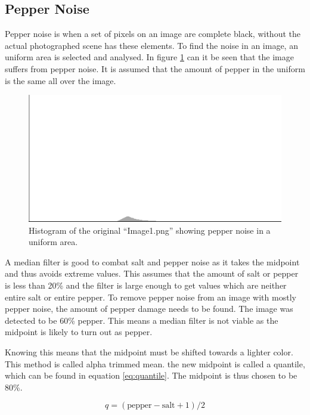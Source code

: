 \subsection{Pepper Noise}\label{image_1}
Pepper noise is when a set of pixels on an image are complete black, without the actual photographed scene has these elements.
To find the noise in an image, an uniform area is selected and analysed.
In figure \ref{fig:hist_pepper_im01} can it be seen that the image suffers from pepper noise.
It is assumed that the amount of pepper in the uniform is the same all over the image.

\begin{figure}[H]
\centering
\includegraphics[width = \histogramWidth]{graphics/hist1_uniform.png}
\caption{Histogram of the original ``Image1.png'' showing pepper noise in a uniform area.}
\label{fig:hist_pepper_im01}
\end{figure}

A median filter is good to combat salt and pepper noise as it takes the midpoint and thus avoids extreme values.
This assumes that the amount of salt or pepper is less than 20\% and the filter is large enough to get values which are neither entire salt or entire pepper.
To remove pepper noise from an image with mostly pepper noise, the amount of pepper damage needs to be found.
The image was detected to be 60\% pepper.
This means a median filter is not viable as the midpoint is likely to turn out as pepper.

Knowing this means that the midpoint must be shifted towards a lighter color.
This method is called alpha trimmed mean.
the new midpoint is called a quantile, which can be found in equation \ref{eq:quantile}.
The midpoint is thus chosen to be 80\%. 

\begin{equation}
 q = (\text{pepper}-\text{salt}+1)/2 \label{eq:quantile}
\end{equation}

